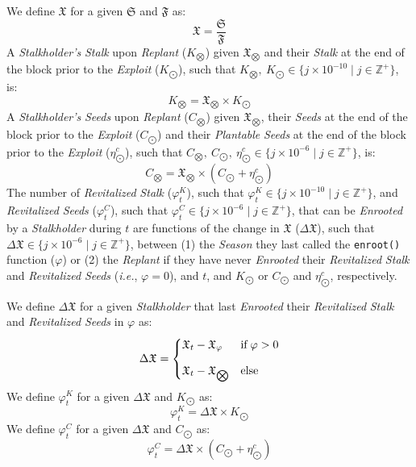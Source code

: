 \documentclass[tikz]{article}
\newcommand{\code}[1]{\texttt{#1}}
\newcommand{\term}[1]{\textsl{#1}}
\begin{document}
We define $\mathfrak{X}$ for a given $\mathfrak{S}$ and $\mathfrak{F}$ as:
$$\mathfrak{X} = \frac{\mathfrak{S}}{\mathfrak{F}}$$
A \term{Stalkholder's} \term{Stalk} upon \term{Replant} ($K_{\bigotimes}$) given $\mathfrak{X}_{\bigotimes}$ and their \term{Stalk} at the end of the block prior to the \term{Exploit} ($K_{\bigodot}$), such that $K_{\bigotimes},\ K_{\bigodot} \in \{j \times 10^{-10} \mid j \in \mathbb{Z}^{+} \}$, is:
$$K_{\bigotimes} = \mathfrak{X}_{\bigotimes} \times K_{\bigodot}$$
A \term{Stalkholder's} \term{Seeds} upon \term{Replant} ($C_{\bigotimes}$) given $\mathfrak{X}_{\bigotimes}$, their \term{Seeds} at the end of the block prior to the \term{Exploit} ($C_{\bigodot}$) and their \term{Plantable} \term{Seeds} at the end of the block prior to the \term{Exploit} ($\eta_{\bigodot}^c$), such that $C_{\bigotimes},\ C_{\bigodot},\ \eta_{\bigodot}^c \in \{j \times 10^{-6} \mid j \in \mathbb{Z}^{+} \}$, is:
$$C_{\bigotimes} = \mathfrak{X}_{\bigotimes} \times (C_{\bigodot} + \eta_{\bigodot}^c)$$
The number of \term{Revitalized} \term{Stalk} (${\varphi}_t^K$), such that ${\varphi}_t^K \in \{j \times 10^{-10} \mid j \in \mathbb{Z}^{+} \}$, and \term{Revitalized} \term{Seeds} (${\varphi}_t^C$), such that ${\varphi}_t^C \in \{j \times 10^{-6} \mid j \in \mathbb{Z}^{+} \}$, that can be \term{Enrooted} by a \term{Stalkholder} during $t$ are functions of the change in $\mathfrak{X}$ ($\Delta \mathfrak{X}$), such that $\Delta \mathfrak{X} \in \{j \times 10^{-6} \mid j \in \mathbb{Z}^{+} \}$, between (1) the \term{Season} they last called the \code{enroot()} function ($\varphi$) or (2) the \term{Replant} if they have never \term{Enrooted} their \term{Revitalized} \term{Stalk} and \term{Revitalized} \term{Seeds} (\term{i.e.}, $\varphi = 0$), and $t$, and $K_{\bigodot}$ or $C_{\bigodot}$ and $\eta_{\bigodot}^c$, respectively. 

We define $\Delta \mathfrak{X}$ for a given \term{Stalkholder} that last \term{Enrooted} their \term{Revitalized} \term{Stalk} and \term{Revitalized} \term{Seeds} in $\varphi$ as:
$$\Delta \mathfrak{X} = \begin{cases} \mathfrak{X}_{t} - \mathfrak{X}_\varphi & \text{if} \; \varphi > 0 \vspace{.3cm} \\ 
\mathfrak{X}_{t} - \mathfrak{X}_{\bigotimes} & \text{else}\end{cases}$$
We define ${\varphi}_t^K$ for a given $\Delta \mathfrak{X}$ and $K_{\bigodot}$ as:
$${\varphi}_t^K = \Delta \mathfrak{X} \times K_{\bigodot}$$
We define ${\varphi}_t^C$ for a given $\Delta \mathfrak{X}$ and $C_{\bigodot}$ as:
$${\varphi}_t^C = \Delta \mathfrak{X} \times (C_{\bigodot} + \eta_{\bigodot}^c)$$
\end{document}
